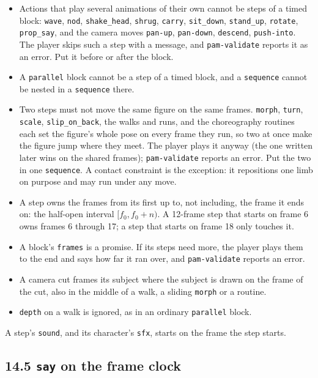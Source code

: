 \documentclass[
  12pt,
  letterpaper,
]{book}
\begin{document}
\begin{itemize}
\item
  Actions that play several animations of their own cannot be steps of
  a timed block: \texttt{wave}, \texttt{nod}, \texttt{shake\_head},
  \texttt{shrug}, \texttt{carry}, \texttt{sit\_down},
  \texttt{stand\_up}, \texttt{rotate}, \texttt{prop\_say}, and the
  camera moves \texttt{pan-up}, \texttt{pan-down}, \texttt{descend},
  \texttt{push-into}. The player skips such a step with a message, and
  \texttt{pam-validate} reports it as an error. Put it before or after
  the block.
\item
  A \texttt{parallel} block cannot be a step of a timed block, and a
  \texttt{sequence} cannot be nested in a \texttt{sequence} there.
\item
  Two steps must not move the same figure on the same frames.
  \texttt{morph}, \texttt{turn}, \texttt{scale},
  \texttt{slip\_on\_back}, the walks and runs, and the choreography
  routines each set the figure's whole pose on every frame they run, so
  two at once make the figure jump where they meet. The player plays it
  anyway (the one written later wins on the shared frames);
  \texttt{pam-validate} reports an error. Put the two in one
  \texttt{sequence}. A contact constraint is the exception: it
  repositions one limb on purpose and may run under any move.
\item
  A step owns the frames from its first up to, not including, the frame
  it ends on: the half-open interval $[f_0, f_0+n)$. A 12-frame step
  that starts on frame 6 owns frames 6 through 17; a step that starts
  on frame 18 only touches it.
\item
  A block's \texttt{frames} is a promise. If its steps need more, the
  player plays them to the end and says how far it ran over, and
  \texttt{pam-validate} reports an error.
\item
  A camera cut frames its subject where the subject is drawn on the
  frame of the cut, also in the middle of a walk, a sliding
  \texttt{morph} or a routine.
\item
  \texttt{depth} on a walk is ignored, as in an ordinary
  \texttt{parallel} block.
\end{itemize}

A step's \texttt{sound}, and its character's \texttt{sfx}, starts on
the frame the step starts.

\subsection{\texorpdfstring{14.5 \texttt{say} on the frame clock}{14.5 say on the frame clock}}\label{say-on-the-frame-clock}
\end{document}
